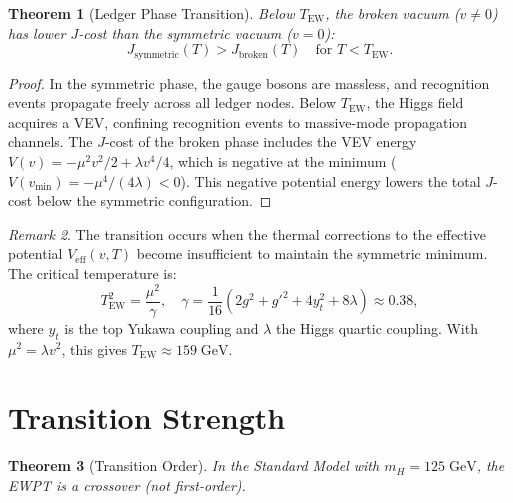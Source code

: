 \documentclass[12pt,a4paper]{article}
\newtheorem{theorem}{Theorem}[section]
\theoremstyle{definition}
\theoremstyle{remark}
\newtheorem{remark}[theorem]{Remark}
\begin{document}
\begin{theorem}[Ledger Phase Transition]
\label{thm:transition}
Below $T_{\mathrm{EW}}$, the broken vacuum ($v \neq 0$) has lower
$J$-cost than the symmetric vacuum ($v = 0$):
\begin{equation}
  J_{\mathrm{symmetric}}(T) > J_{\mathrm{broken}}(T)
  \quad \text{for } T < T_{\mathrm{EW}}.
\end{equation}
\end{theorem}

\begin{proof}
In the symmetric phase, the gauge bosons are massless, and recognition
events propagate freely across all ledger nodes.  Below
$T_{\mathrm{EW}}$, the Higgs field acquires a VEV, confining
recognition events to massive-mode propagation channels.  The
$J$-cost of the broken phase includes the VEV energy
$V(v) = -\mu^2 v^2/2 + \lambda v^4/4$, which is negative at the
minimum ($V(v_{\min}) = -\mu^4/(4\lambda) < 0$).  This negative
potential energy lowers the total $J$-cost below the symmetric
configuration.
\end{proof}

\begin{remark}
The transition occurs when the thermal corrections to the effective
potential $V_{\mathrm{eff}}(v, T)$ become insufficient to maintain
the symmetric minimum.  The critical temperature is:
\begin{equation}
  T_{\mathrm{EW}}^2 = \frac{\mu^2}{\gamma},
  \quad \gamma = \frac{1}{16}\!\left(2g^2 + g'^2 + 4y_t^2 +
  8\lambda\right) \approx 0.38,
\end{equation}
where $y_t$ is the top Yukawa coupling and $\lambda$ the Higgs
quartic coupling.  With $\mu^2 = \lambda v^2$, this gives
$T_{\mathrm{EW}} \approx 159\;\mathrm{GeV}$.
\end{remark}

\section{Transition Strength}
\label{sec:strength}

\begin{theorem}[Transition Order]
In the Standard Model with $m_H = 125\;\mathrm{GeV}$, the EWPT
is a crossover (not first-order).
\end{theorem}
\end{document}
